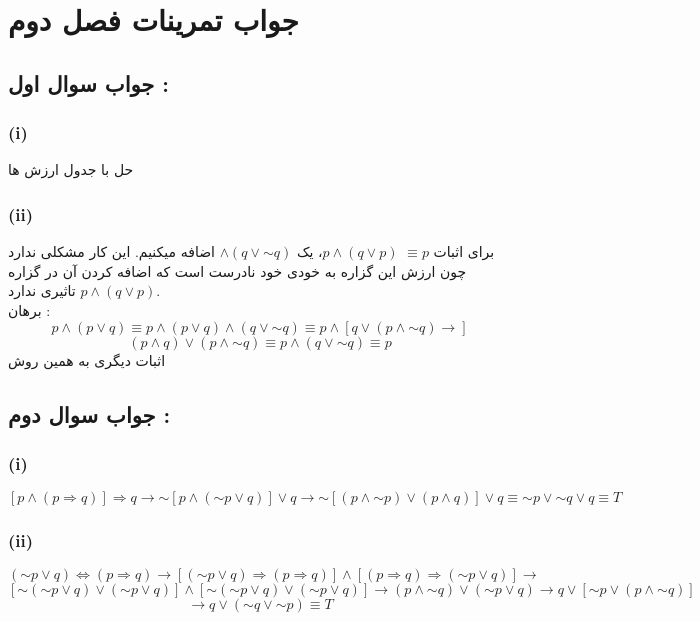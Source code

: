 \documentclass{article}
\newcommand{\tildevar}{\mathord{\sim}}
\begin{document}
	\section*{ جواب تمرینات فصل دوم}
		\subsection*{جواب سوال اول :}
			\subsubsection*{(i)}
				حل با جدول ارزش ها

			\subsubsection*{(ii)}
				برای اثبات $\equiv p$ $p \land (q \lor p)$، یک $\land (q \lor\tildevar q)$ اضافه میکنیم. این کار مشکلی ندارد چون ارزش این گزاره به خودی خود نادرست است که اضافه کردن آن در گزاره  $p \land (q \lor p)$ تاثیری ندارد. 
				\\  برهان : \\
				\[
				p \land (p \lor q) \equiv p \land (p \lor q) \land (q \lor \tildevar q) \equiv p \land [q \lor (p \land \tildevar q) \rightarrow]
				\]
				\[
				(p \land q) \lor (p \land \tildevar q) \equiv p \land (q \lor \tildevar q) \equiv p
				\]
				اثبات دیگری به همین روش
				
		\subsection*{جواب سوال دوم :}
			\subsubsection*{(i)}
				\[ [p \land (p \Rightarrow q)] \Rightarrow q \rightarrow \tildevar[p \land (\tildevar p \lor q)] \lor q \rightarrow \tildevar[(p \land 									\tildevar p) \lor (p \land q)] \lor q \equiv\tildevar p \lor \tildevar q \lor q \equiv T\]

			\subsubsection*{(ii)}
				\[ (\tildevar p \lor q) \Leftrightarrow (p \Rightarrow q) \rightarrow [(\tildevar p \lor q) \Rightarrow (p \Rightarrow q)] \land [(p \Rightarrow q) 						\Rightarrow (\tildevar p \lor q)] \rightarrow  \]
				\[
				 [\tildevar (\tildevar p \lor q) \lor (\tildevar p \lor q)] \land [\tildevar (\tildevar p \lor q) \lor (\tildevar p \lor q)] 	\rightarrow 
				 (p \land \tildevar q) \lor (\tildevar p \lor q) \rightarrow q \lor [\tildevar p \lor (p \land \tildevar q)]
				\]
				\[
				\rightarrow q \lor (\tildevar q \lor \tildevar p) \equiv T
				\]
\end{document}
